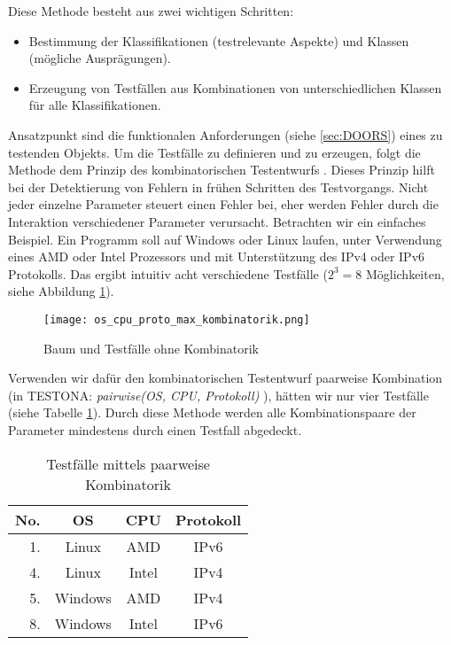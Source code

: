  Diese Methode besteht aus zwei wichtigen Schritten:
\begin{itemize}
\item Bestimmung der Klassifikationen (testrelevante Aspekte) und Klassen (mögliche Ausprägungen).
\item Erzeugung von Testfällen aus Kombinationen von unterschiedlichen Klassen für alle Klassifikationen.
\end{itemize}

Ansatzpunkt sind die funktionalen Anforderungen (siehe \ref{sec:DOORS}) eines zu testenden Objekts. Um die Testfälle zu definieren und zu erzeugen, folgt die Methode dem Prinzip des kombinatorischen Testentwurfs \cite{Kombinatorisches}. Dieses Prinzip hilft bei der Detektierung von Fehlern in frühen Schritten des Testvorgangs. Nicht jeder einzelne Parameter steuert einen Fehler bei, eher werden Fehler durch die Interaktion verschiedener Parameter verursacht. Betrachten wir ein einfaches Beispiel. Ein Programm soll auf Windows oder Linux laufen, unter Verwendung eines AMD oder Intel Prozessors und mit Unterstützung des IPv4 oder IPv6 Protokolls. Das ergibt intuitiv acht verschiedene Testfälle ($2^{3} = 8$ Möglichkeiten, siehe Abbildung \ref{ttn.no_kombi}).\\

\begin{figure}[h]
  \begin{center}
    \texttt{[image: os\_cpu\_proto\_max\_kombinatorik.png]}
  		  \caption{Baum und Testfälle ohne Kombinatorik}
     \label{ttn.no_kombi}
  \end{center}
\end{figure}


Verwenden wir dafür den kombinatorischen Testentwurf \glqq paarweise Kombination\grqq~ (in TESTONA: \textit{pairwise(OS, CPU, Protokoll)} ), hätten wir nur vier Testfälle (siehe Tabelle \ref{table:4TestCases}). Durch diese Methode werden alle Kombinationspaare der Parameter mindestens durch einen Testfall abgedeckt\cite{CombinatorialSoftTesting}.\\

\begin{table}[h]


\begin{center}
	\begin{tabular}{|r||c|c|c|}
	 \hline
	 No. &OS &CPU &Protokoll\\
	 \hline \hline
	 1. &Linux &AMD &IPv6\\
	 \hline
	 4. &Linux &Intel &IPv4\\
	 \hline
	 5. &Windows &AMD &IPv4\\
	 \hline
	 8. &Windows &Intel &IPv6\\
	 \hline
	\end{tabular}
	
	\caption{Testfälle mittels paarweise Kombinatorik}
	\label{table:4TestCases}
\end{center}

\end{table}


